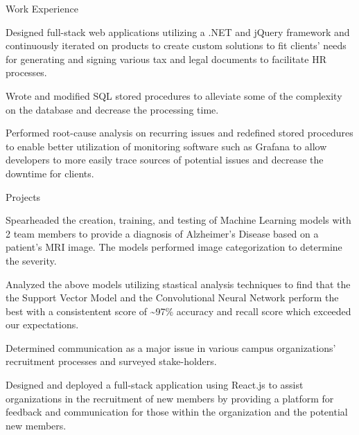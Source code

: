 \documentclass{resume} %
\begin{document}
\begin{workSection}{Work Experience}
     \experienceItem[
        company=Ultimate Kronos Group (UKG),
        location=Atlanta{,} GA,
        position=Full-stack Software Engineer Intern,
        duration=January 2022 - August 2022,
     ]
     \begin{bullets}
        \item Designed full-stack web applications utilizing a .NET and jQuery framework and continuously iterated on products to create custom solutions to fit clients' needs for generating and signing various tax and legal documents to facilitate HR processes.
        \item Wrote and modified SQL stored procedures to alleviate some of the complexity on the database and decrease the processing time.
        \item Performed root-cause analysis on recurring issues and redefined stored procedures to enable better utilization of monitoring software such as Grafana to allow developers to more easily trace sources of potential issues and decrease the downtime for clients.
     \end{bullets}
     
\end{workSection}



\begin{workSection}{Projects}
    \customItem[
        title=Alzheimer's Disease Detection Project,
        duration=August 2023 - December 2023,
        keyHighlight=Machine Learning Models,
        location=Atlanta{,} GA
     ]
     \begin{bullets}
        \item Spearheaded the creation, training, and testing of Machine Learning models with 2 team members to provide a diagnosis of Alzheimer's Disease based on a patient's MRI image. The models performed image categorization to determine the severity.
        \item Analyzed the above models utilizing stastical analysis techniques to find that the the Support Vector Model and the Convolutional Neural Network perform the best with a consistentent score of \textasciitilde 97\% accuracy and recall score which exceeded our expectations.
     \end{bullets}

     \customItem[
        title=RushKit,
        duration=July 2022 - December 2022,
        keyHighlight=Recruitment Web Application,
        location=Atlanta{,} GA
     ]
     \begin{bullets}
        \item Determined communication as a major issue in various campus organizations' recruitment processes and surveyed stake-holders.
        \item Designed and deployed a full-stack application using React.js to assist organizations in the recruitment of new members by providing a platform for feedback and communication for those within the organization and the potential new members.
     \end{bullets}     
\end{workSection}
\end{document}

